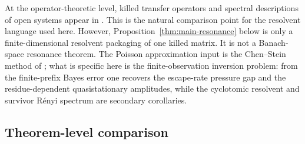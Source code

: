 At the operator-theoretic level, killed transfer operators and spectral
descriptions of open systems appear in
\citet{KellerLiverani2009,FroylandStancevic2010,DemersWrightYoung2012,FergusonPollicott2012,AtnipFroylandGonzalezTokmanVaienti2023}.
This is the natural comparison point for the resolvent language used
here.  However, Proposition~\ref{thm:main-resonance} below is only a
finite-dimensional resolvent packaging of one killed matrix.  It is not
a Banach-space resonance theorem.  The Poisson approximation input is
the Chen--Stein method of \citet{ArratiaGoldsteinGordon1989}; what is
specific here is the finite-observation inversion problem: from the
finite-prefix Bayes error one recovers the escape-rate pressure gap and
the residue-dependent quasistationary amplitudes, while the cyclotomic
resolvent and survivor R\'enyi spectrum are secondary corollaries.

\subsection*{Theorem-level comparison}

